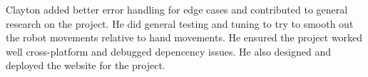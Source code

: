 \documentclass{article}
\begin{document}
Clayton added better error handling for edge cases and contributed to general
research on the project. He did general testing and tuning to try to smooth out
the robot movements relative to hand movements. He ensured the
project worked well cross-platform and debugged depencency issues. He also designed
and deployed the website for the project.

\clearpage


\raggedright
\end{document}
